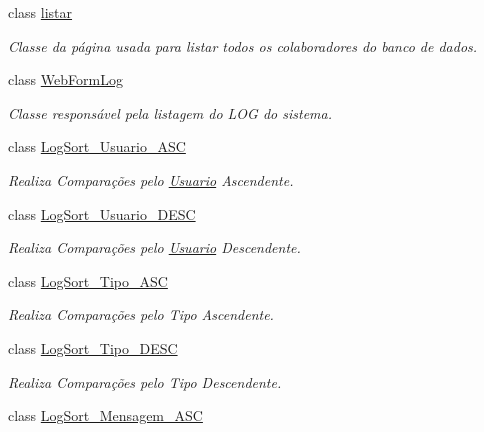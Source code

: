 \begin{DoxyCompactItemize}
class \hyperlink{class_sistema_r_h_1_1listar}{listar}
\begin{DoxyCompactList}\small\item\em Classe da página usada para listar todos os colaboradores do banco de dados. \item\end{DoxyCompactList}\item 
class \hyperlink{class_sistema_r_h_1_1_web_form_log}{WebFormLog}
\begin{DoxyCompactList}\small\item\em Classe responsável pela listagem do LOG do sistema. \item\end{DoxyCompactList}\item 
class \hyperlink{class_sistema_r_h_1_1_log_sort___usuario___a_s_c}{LogSort\_\-Usuario\_\-ASC}
\begin{DoxyCompactList}\small\item\em Realiza Comparações pelo \hyperlink{class_sistema_r_h_1_1_usuario}{Usuario} Ascendente. \item\end{DoxyCompactList}\item 
class \hyperlink{class_sistema_r_h_1_1_log_sort___usuario___d_e_s_c}{LogSort\_\-Usuario\_\-DESC}
\begin{DoxyCompactList}\small\item\em Realiza Comparações pelo \hyperlink{class_sistema_r_h_1_1_usuario}{Usuario} Descendente. \item\end{DoxyCompactList}\item 
class \hyperlink{class_sistema_r_h_1_1_log_sort___tipo___a_s_c}{LogSort\_\-Tipo\_\-ASC}
\begin{DoxyCompactList}\small\item\em Realiza Comparações pelo Tipo Ascendente. \item\end{DoxyCompactList}\item 
class \hyperlink{class_sistema_r_h_1_1_log_sort___tipo___d_e_s_c}{LogSort\_\-Tipo\_\-DESC}
\begin{DoxyCompactList}\small\item\em Realiza Comparações pelo Tipo Descendente. \item\end{DoxyCompactList}\item 
class \hyperlink{class_sistema_r_h_1_1_log_sort___mensagem___a_s_c}{LogSort\_\-Mensagem\_\-ASC}

\end{DoxyCompactItemize}
